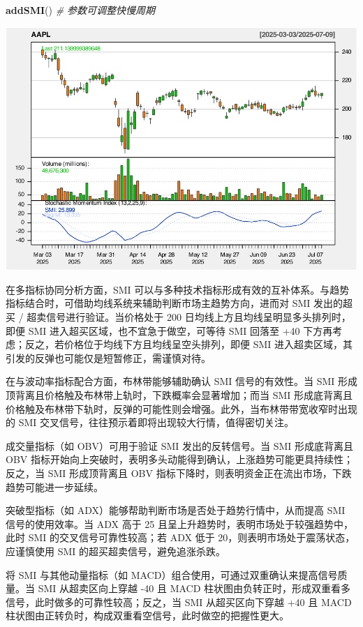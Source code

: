 \documentclass[]{ctexbook}
\newenvironment{Shaded}{\begin{snugshade}}{\end{snugshade}}
\newcommand{\CommentTok}[1]{\textcolor[rgb]{0.56,0.35,0.01}{\textit{#1}}}
\newcommand{\FunctionTok}[1]{\textcolor[rgb]{0.13,0.29,0.53}{\textbf{#1}}}
\newcommand{\NormalTok}[1]{#1}
\begin{document}
\begin{Shaded}
\begin{Highlighting}[]
\FunctionTok{addSMI}\NormalTok{()  }\CommentTok{\# 参数可调整快慢周期}
\end{Highlighting}
\end{Shaded}

\includegraphics[width=0.9\linewidth]{quantmod_files/figure-latex/smi-2}

在多指标协同分析方面，SMI 可以与多种技术指标形成有效的互补体系。与趋势指标结合时，可借助均线系统来辅助判断市场主趋势方向，进而对 SMI 发出的超买 / 超卖信号进行验证。当价格处于 200 日均线上方且均线呈明显多头排列时，即便 SMI 进入超买区域，也不宜急于做空，可等待 SMI 回落至 +40 下方再考虑；反之，若价格位于均线下方且均线呈空头排列，即便 SMI 进入超卖区域，其引发的反弹也可能仅是短暂修正，需谨慎对待。

在与波动率指标配合方面，布林带能够辅助确认 SMI 信号的有效性。当 SMI 形成顶背离且价格触及布林带上轨时，下跌概率会显著增加；而当 SMI 形成底背离且价格触及布林带下轨时，反弹的可能性则会增强。此外，当布林带带宽收窄时出现的 SMI 交叉信号，往往预示着即将出现较大行情，值得密切关注。

成交量指标（如 OBV）可用于验证 SMI 发出的反转信号。当 SMI 形成底背离且 OBV 指标开始向上突破时，表明多头动能得到确认，上涨趋势可能更具持续性；反之，当 SMI 形成顶背离且 OBV 指标下降时，则表明资金正在流出市场，下跌趋势可能进一步延续。

突破型指标（如 ADX）能够帮助判断市场是否处于趋势行情中，从而提高 SMI 信号的使用效率。当 ADX 高于 25 且呈上升趋势时，表明市场处于较强趋势中，此时 SMI 的交叉信号可靠性较高；若 ADX 低于 20，则表明市场处于震荡状态，应谨慎使用 SMI 的超买超卖信号，避免追涨杀跌。

将 SMI 与其他动量指标（如 MACD）组合使用，可通过双重确认来提高信号质量。当 SMI 从超卖区向上穿越 -40 且 MACD 柱状图由负转正时，形成双重看多信号，此时做多的可靠性较高；反之，当 SMI 从超买区向下穿越 +40 且 MACD 柱状图由正转负时，构成双重看空信号，此时做空的把握性更大。
\end{document}

